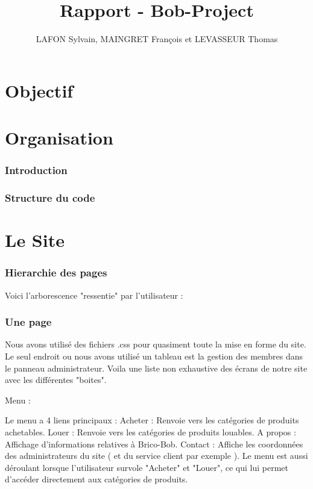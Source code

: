 \documentclass[10pt,a4paper]{article}
\author{LAFON Sylvain, MAINGRET François et LEVASSEUR Thomas}
\title{Rapport - Bob-Project}
\begin{document}
	\maketitle
	\tableofcontents
	\newpage
	\part{Objectif}
		
	
	\newpage
	\part{Organisation}
		\section{Introduction}
			

		\section{Structure du code}
			
	\newpage
	\part{Le Site}		
		\section{Hierarchie des pages}
			Voici l'arborescence "ressentie" par l'utilisateur :
			
		\section{Une page}	
			Nous avons utilisé des fichiers .css pour quasiment toute la mise en forme du site. Le seul endroit ou nous avons utilisé un tableau est la gestion des membres dans le panneau administrateur. Voila une liste non exhaustive des écrans de notre site avec les différentes "boites".
			
			Menu :

	Le menu a 4 liens principaux : 
	Acheter : Renvoie vers les catégories de produits achetables.
	Louer : Renvoie vers les catégories de produits louables.
	A propos : Affichage d'informations relatives à Brico-Bob.
	Contact : Affiche les coordonnées des administrateurs du site ( et du service 	client par exemple ).
	Le menu est aussi déroulant lorsque l'utilisateur survole "Acheter" et "Louer", 	ce qui lui permet d'accéder directement aux catégories de produits.
	
\end{document}

